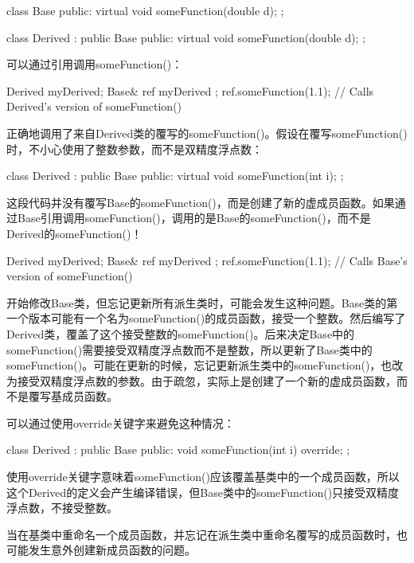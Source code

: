 \begin{cpp}
class Base
{
    public:
    virtual void someFunction(double d);
};

class Derived : public Base
{
    public:
    virtual void someFunction(double d);
};
\end{cpp}

可以通过引用调用someFunction()：

\begin{cpp}
Derived myDerived;
Base& ref { myDerived };
ref.someFunction(1.1); // Calls Derived's version of someFunction()
\end{cpp}

正确地调用了来自Derived类的覆写的someFunction()。假设在覆写someFunction()时，不小心使用了整数参数，而不是双精度浮点数：

\begin{cpp}
class Derived : public Base
{
    public:
        virtual void someFunction(int i);
};
\end{cpp}

这段代码并没有覆写Base的someFunction()，而是创建了新的虚成员函数。如果通过Base引用调用someFunction()，调用的是Base的someFunction()，而不是Derived的someFunction()！

\begin{cpp}
Derived myDerived;
Base& ref { myDerived };
ref.someFunction(1.1); // Calls Base's version of someFunction()
\end{cpp}

开始修改Base类，但忘记更新所有派生类时，可能会发生这种问题。Base类的第一个版本可能有一个名为someFunction()的成员函数，接受一个整数。然后编写了Derived类，覆盖了这个接受整数的someFunction()。后来决定Base中的someFunction()需要接受双精度浮点数而不是整数，所以更新了Base类中的someFunction()。可能在更新的时候，忘记更新派生类中的someFunction()，也改为接受双精度浮点数的参数。由于疏忽，实际上是创建了一个新的虚成员函数，而不是覆写基成员函数。

可以通过使用override关键字来避免这种情况：

\begin{cpp}
class Derived : public Base
{
    public:
        void someFunction(int i) override;
};
\end{cpp}

使用override关键字意味着someFunction()应该覆盖基类中的一个成员函数，所以这个Derived的定义会产生编译错误，但Base类中的someFunction()只接受双精度浮点数，不接受整数。

当在基类中重命名一个成员函数，并忘记在派生类中重命名覆写的成员函数时，也可能发生意外创建新成员函数的问题。

